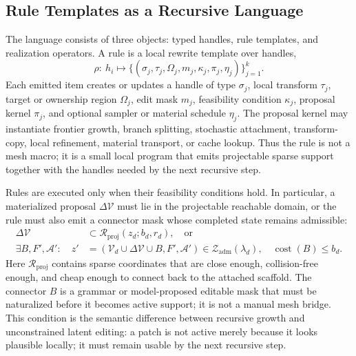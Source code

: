 \documentclass[sigconf,anonymous,review]{acmart}
\begin{document}
\subsection{Rule Templates as a Recursive Language}
The language consists of three objects: typed handles, rule templates, and realization operators. A rule is a local rewrite template over handles,
\begin{equation}
\rho:\ h_i\mapsto
\{(\sigma_j,\tau_j,\Omega_j,m_j,\kappa_j,\pi_j,\eta_j)\}_{j=1}^{k}.
\end{equation}
Each emitted item creates or updates a handle of type $\sigma_j$, local transform $\tau_j$, target or ownership region $\Omega_j$, edit mask $m_j$, feasibility condition $\kappa_j$, proposal kernel $\pi_j$, and optional sampler or material schedule $\eta_j$. The proposal kernel may instantiate frontier growth, branch splitting, stochastic attachment, transform-copy, local refinement, material transport, or cache lookup. Thus the rule is not a mesh macro; it is a small local program that emits projectable sparse support together with the handles needed by the next recursive step.

Rules are executed only when their feasibility conditions hold. In particular, a materialized proposal $\Delta\mathcal V$ must lie in the projectable reachable domain, or the rule must also emit a connector mask whose completed state remains admissible:
\begin{align}
\Delta\mathcal V &\subset
\mathcal R_{\mathrm{proj}}(z_d;b_d,r_d),
\quad\text{or}\nonumber\\
\exists B,F',\mathcal A':\quad
z'&=(\mathcal V_d\cup\Delta\mathcal V\cup B,F',\mathcal A')
\in\mathcal Z_{\mathrm{adm}}(\lambda_d),\quad
\operatorname{cost}(B)\le b_d.
\end{align}
Here $\mathcal R_{\mathrm{proj}}$ contains sparse coordinates that are close enough, collision-free enough, and cheap enough to connect back to the attached scaffold. The connector $B$ is a grammar or model-proposed editable mask that must be naturalized before it becomes active support; it is not a manual mesh bridge. This condition is the semantic difference between recursive growth and unconstrained latent editing: a patch is not active merely because it looks plausible locally; it must remain usable by the next recursive step.
\end{document}
